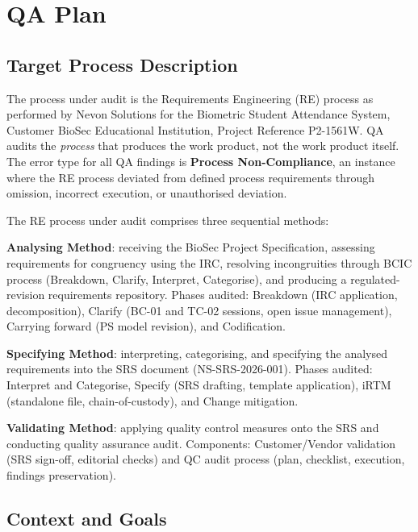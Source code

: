 \documentclass[11pt,a4paper]{article}
\begin{document}
\section{QA Plan}

\subsection{Target Process Description}

The process under audit is the Requirements Engineering (RE) process as performed by Nevon Solutions for the Biometric Student Attendance System, Customer BioSec Educational Institution, Project Reference P2-1561W. QA audits the \emph{process} that produces the work product, not the work product itself. The error type for all QA findings is \textbf{Process Non-Compliance}, an instance where the RE process deviated from defined process requirements through omission, incorrect execution, or unauthorised deviation.

The RE process under audit comprises three sequential methods:

\textbf{Analysing Method}: receiving the BioSec Project Specification, assessing requirements for congruency using the IRC, resolving incongruities through BCIC process (Breakdown, Clarify, Interpret, Categorise), and producing a regulated-revision requirements repository. Phases audited: Breakdown (IRC application, decomposition), Clarify (BC-01 and TC-02 sessions, open issue management), Carrying forward (PS model revision), and Codification.

\textbf{Specifying Method}: interpreting, categorising, and specifying the analysed requirements into the SRS document (NS-SRS-2026-001). Phases audited: Interpret and Categorise, Specify (SRS drafting, template application), iRTM (standalone file, chain-of-custody), and Change mitigation.

\textbf{Validating Method}: applying quality control measures onto the SRS and conducting quality assurance audit. Components: Customer/Vendor validation (SRS sign-off, editorial checks) and QC audit process (plan, checklist, execution, findings preservation).

\subsection{Context and Goals}
\end{document}
